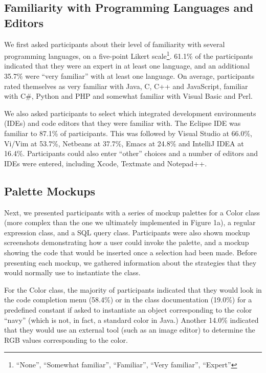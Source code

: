 \documentclass[10pt, conference, compsocconf]{IEEEtran}
\begin{document}
\subsection{Familiarity with Programming Languages and Editors}

We first asked participants about their level of familiarity with several programming languages, on a five-point Likert scale\footnote{``None'', ``Somewhat familiar'', ``Familiar'', ``Very familiar'', ``Expert''}. 61.1\% of the participants indicated that they were an expert in at least one language, and an additional 35.7\% were ``very familiar'' with at least one language. On average, participants rated themselves as very familiar with Java, C, C++ and JavaScript, familiar with C\#, Python and PHP and somewhat familiar with Visual Basic and Perl.

We also asked participants to select which integrated development environments (IDEs) and code editors that they were familiar with. The Eclipse IDE was familiar to 87.1\% of participants. This was followed by Visual Studio at 66.0\%, Vi/Vim at 53.7\%, Netbeans at 37.7\%, Emacs at 24.8\% and IntelliJ IDEA at 16.4\%. Participants could also enter ``other'' choices and a number of editors and IDEs were entered, including Xcode, Textmate and Notepad++.

\subsection{Palette Mockups}

%
Next, we presented participants with a series of mockup palettes for a Color class (more complex than the one we ultimately implemented in Figure 1a), a regular expression class, and a SQL query class. Participants were also shown mockup screenshots demonstrating how a user could invoke the palette, and a mockup showing the code that would be inserted once a selection had been made. Before presenting each mockup, we gathered information about  the strategies that they would normally use to instantiate the class.

For the Color class, the majority of participants indicated that they would look in the code completion menu (58.4\%) or in the class documentation (19.0\%) for a predefined constant if asked to instantiate an object corresponding to the color ``navy'' (which is not, in fact, a standard color in Java.) Another 14.0\% indicated that they would use an external tool (such as an image editor) to determine the RGB values corresponding to the color. 
 
\end{document}
